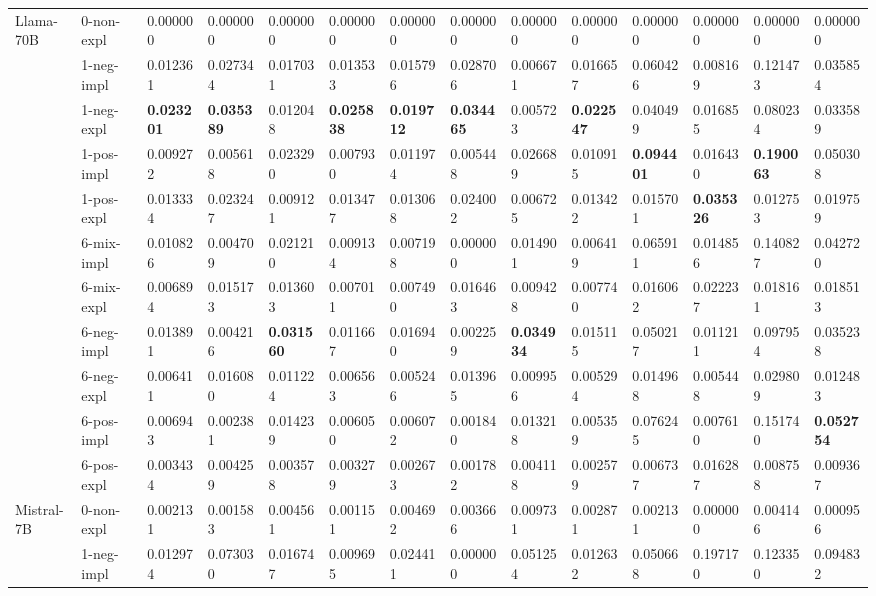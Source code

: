 \begin{tabular}{ll|llll|llll|llll}
 \midrule
\multirow[t]{11}{*}{Llama-70B} & 0-non-expl & 0.000000 & 0.000000 & 0.000000 & 0.000000 & 0.000000 & 0.000000 & 0.000000 & 0.000000 & 0.000000 & 0.000000 & 0.000000 & 0.000000 \\
 & 1-neg-impl & 0.012361 & 0.027344 & 0.017031 & 0.013533 & 0.015796 & 0.028706 & 0.006671 & 0.016657 & 0.060426 & 0.008169 & 0.121473 & 0.035854 \\
 & 1-neg-expl & \bfseries 0.023201 & \bfseries 0.035389 & 0.012048 & \bfseries 0.025838 & \bfseries 0.019712 & \bfseries 0.034465 & 0.005723 & \bfseries 0.022547 & 0.040499 & 0.016855 & 0.080234 & 0.033589 \\
 & 1-pos-impl & 0.009272 & 0.005618 & 0.023290 & 0.007930 & 0.011974 & 0.005448 & 0.026689 & 0.010915 & \bfseries 0.094401 & 0.016430 & \bfseries 0.190063 & 0.050308 \\
 & 1-pos-expl & 0.013334 & 0.023247 & 0.009121 & 0.013477 & 0.013068 & 0.024002 & 0.006725 & 0.013422 & 0.015701 & \bfseries 0.035326 & 0.012753 & 0.019759 \\
 & 6-mix-impl & 0.010826 & 0.004709 & 0.021210 & 0.009134 & 0.007198 & 0.000000 & 0.014901 & 0.006419 & 0.065911 & 0.014856 & 0.140827 & 0.042720 \\
 & 6-mix-expl & 0.006894 & 0.015173 & 0.013603 & 0.007011 & 0.007490 & 0.016463 & 0.009428 & 0.007740 & 0.016062 & 0.022237 & 0.018161 & 0.018513 \\
 & 6-neg-impl & 0.013891 & 0.004216 & \bfseries 0.031560 & 0.011667 & 0.016940 & 0.002259 & \bfseries 0.034934 & 0.015115 & 0.050217 & 0.011211 & 0.097954 & 0.035238 \\
 & 6-neg-expl & 0.006411 & 0.016080 & 0.011224 & 0.006563 & 0.005246 & 0.013965 & 0.009956 & 0.005294 & 0.014968 & 0.005448 & 0.029809 & 0.012483 \\
 & 6-pos-impl & 0.006943 & 0.002381 & 0.014239 & 0.006050 & 0.006072 & 0.001840 & 0.013218 & 0.005359 & 0.076245 & 0.007610 & 0.151740 & \bfseries 0.052754 \\
 & 6-pos-expl & 0.003434 & 0.004259 & 0.003578 & 0.003279 & 0.002673 & 0.001782 & 0.004118 & 0.002579 & 0.006737 & 0.016287 & 0.008758 & 0.009367 \\
 \midrule
\multirow[t]{11}{*}{Mistral-7B} & 0-non-expl & 0.002131 & 0.001583 & 0.004561 & 0.001151 & 0.004692 & 0.003666 & 0.009731 & 0.002871 & 0.002131 & 0.000000 & 0.004146 & 0.000956 \\
 & 1-neg-impl & 0.012974 & 0.073030 & 0.016747 & 0.009695 & 0.024411 & 0.000000 & 0.051254 & 0.012632 & 0.050668 & 0.197170 & 0.123350 & 0.094832 \\

\end{tabular}
